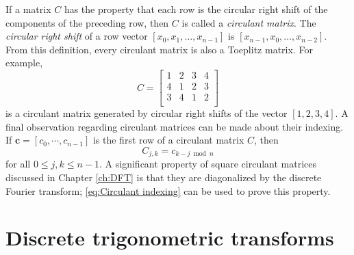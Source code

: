\documentclass[12pt,notitlepage]{report}
\begin{document}
If a matrix $C$ has the property that each row is the circular right shift of the components of the preceding row, then $C$ is called a \textit{circulant matrix}. The \textit{circular right shift} of a row vector $[x_0,x_1,\ldots,x_{n-1}]$ is $[x_{n-1},x_0,\ldots,x_{n-2}]$. From this definition, every circulant matrix is also a Toeplitz matrix. For example,
\[C = \begin{bmatrix}
1 & 2 & 3 & 4 \\
4 & 1 & 2 & 3 \\
3 & 4 & 1 & 2 \\
\end{bmatrix}\] 
is a circulant matrix generated by circular right shifts of the vector $[1,2,3,4]$. A final observation regarding circulant matrices can be made about their indexing. If $\mathbf{c} = [c_0,\cdots,c_{n-1}]$ is the first row of a circulant matrix $C$, then
\begin{equation}
\label{eq:Circulant indexing}
C_{j,k} = c_{k-j \bmod n}
\end{equation}
for all $0 \leq j,k \leq n-1$. A significant property of square circulant matrices discussed in Chapter \ref{ch:DFT} is that they are diagonalized by the discrete Fourier transform; \eqref{eq:Circulant indexing} can be used to prove this property.

\section{Discrete trigonometric transforms} \label{sec:Discrete trig. transforms}
\end{document}
